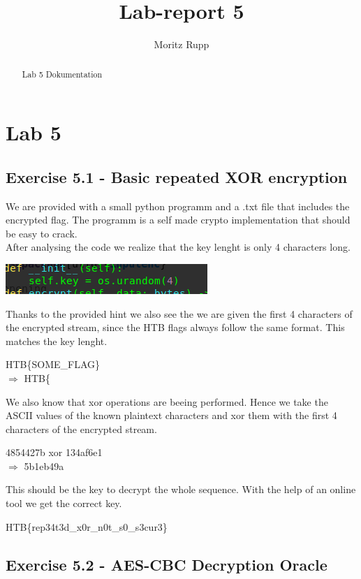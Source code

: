 \documentclass[a4paper,10pt]{article}
\title{Lab-report 5}
\author{Moritz Rupp}
\begin{document}
\maketitle
\tableofcontents
\begin{abstract}
Lab 5 Dokumentation
\end{abstract}
\newpage
\section{Lab 5}
\subsection{Exercise 5.1 - Basic repeated XOR encryption}
We are provided with a small python programm and a .txt file that includes the encrypted flag. The programm is a self made crypto implementation that should be easy to crack.\\
After analysing the code we realize that the key lenght is only 4 characters long.	
\begin{center}
 \includegraphics[scale=0.5]{keylen.png}
\end{center}
Thanks to the provided hint we also see the we are given the first 4 characters of the encrypted stream, since the HTB flags always follow the same format. This matches the key lenght.
\begin{center}
 \begin{shaded}
 HTB\{SOME\_FLAG\}\\
 $\Rightarrow$ HTB\{ 
\end{shaded}
\end{center}
We also know that xor operations are beeing performed. Hence we take the ASCII values of the known plaintext characters and xor them with the first 4 characters of the encrypted stream.
\begin{center}
4854427b xor 134af6e1\\
$\Rightarrow$ 5b1eb49a
\end{center}
This should be the key to decrypt the whole sequence. With the help of an online tool we get the correct key.
\begin{center}
 \begin{shaded}
 HTB\{rep34t3d\_x0r\_n0t\_s0\_s3cur3\}
 \end{shaded}
\end{center}
\newpage
\subsection{Exercise 5.2 - AES-CBC Decryption Oracle}
\end{document}
